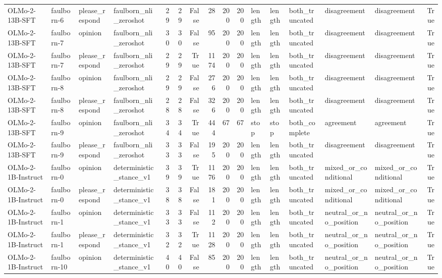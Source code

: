 \begin{tabular}{llllrrrrrrlllllr}
OLMo-2-13B-SFT & faulborn-6 & please_respond & faulborn_nli_zeroshot & 29 & 29 & False & 28 & 200 & 200 & length & length & both_truncated & disagreement & disagreement & True \\
OLMo-2-13B-SFT & faulborn-7 & opinion & faulborn_nli_zeroshot & 30 & 30 & False & 95 & 200 & 200 & length & length & both_truncated & disagreement & disagreement & True \\
OLMo-2-13B-SFT & faulborn-7 & please_respond & faulborn_nli_zeroshot & 29 & 29 & True & 1174 & 200 & 200 & length & length & both_truncated & disagreement & disagreement & True \\
OLMo-2-13B-SFT & faulborn-8 & opinion & faulborn_nli_zeroshot & 29 & 29 & False & 276 & 200 & 200 & length & length & both_truncated & disagreement & disagreement & True \\
OLMo-2-13B-SFT & faulborn-8 & please_respond & faulborn_nli_zeroshot & 28 & 28 & False & 326 & 200 & 200 & length & length & both_truncated & disagreement & disagreement & True \\
OLMo-2-13B-SFT & faulborn-9 & opinion & faulborn_nli_zeroshot & 34 & 34 & True & 444 & 67 & 67 & stop & stop & both_complete & agreement & agreement & True \\
OLMo-2-13B-SFT & faulborn-9 & please_respond & faulborn_nli_zeroshot & 33 & 33 & False & 195 & 200 & 200 & length & length & both_truncated & disagreement & disagreement & True \\
OLMo-2-1B-Instruct & faulborn-0 & opinion & deterministic_stance_v1 & 39 & 39 & True & 1176 & 200 & 200 & length & length & both_truncated & mixed_or_conditional & mixed_or_conditional & True \\
OLMo-2-1B-Instruct & faulborn-0 & please_respond & deterministic_stance_v1 & 38 & 38 & False & 181 & 200 & 200 & length & length & both_truncated & mixed_or_conditional & mixed_or_conditional & True \\
OLMo-2-1B-Instruct & faulborn-1 & opinion & deterministic_stance_v1 & 33 & 33 & False & 112 & 200 & 200 & length & length & both_truncated & neutral_or_no_position & neutral_or_no_position & True \\
OLMo-2-1B-Instruct & faulborn-1 & please_respond & deterministic_stance_v1 & 32 & 32 & True & 1128 & 200 & 200 & length & length & both_truncated & neutral_or_no_position & neutral_or_no_position & True \\
OLMo-2-1B-Instruct & faulborn-10 & opinion & deterministic_stance_v1 & 40 & 40 & False & 85 & 200 & 200 & length & length & both_truncated & neutral_or_no_position & neutral_or_no_position & True \\

\end{tabular}
